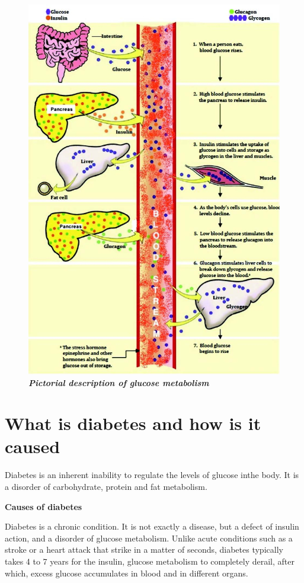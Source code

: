 \begin{figure}[h]
\centering
\includegraphics[scale=2.5]{images/018.jpg}\\
\textbf{\textit{Pictorial description of glucose metabolism}}
\end{figure}


\chapter{What is diabetes and how is it caused}\label{chap3}

Diabetes is an inherent inability to regulate the levels of glucose in\break the body. It is a disorder of carbohydrate, protein and fat metabolism.

\noindent
\textbf{Causes of diabetes}

Diabetes is a chronic condition. It is not exactly a disease, but a defect of insulin action, and a disorder of glucose metabolism. Unlike acute conditions such as a stroke or a heart attack that strike in a matter of seconds, diabetes typically takes 4 to 7 years for the insulin, glucose metabolism to completely derail, after which, excess glucose accumulates in blood and in different organs.

